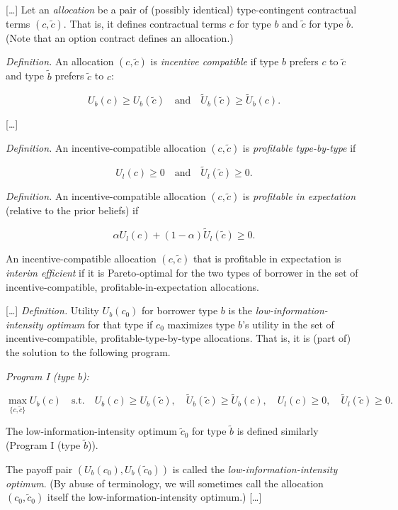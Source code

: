 \documentclass[11pt,a4paper]{article}
\begin{document}
{[}\ldots{]} Let an \emph{allocation} be a pair of (possibly identical) type-contingent contractual
terms \((c, \tilde{c})\). That is, it defines contractual terms \(c\) for type \(b\) and
\(\tilde{c}\) for type \(\tilde{b}\). (Note that an option contract defines an allocation.)

\emph{Definition.} An allocation \((c, \tilde{c})\) is \emph{incentive compatible} if type \(b\)
prefers \(c\) to \(\tilde{c}\) and type \(\tilde{b}\) prefers \(\tilde{c}\) to \(c\):

\[U_b(c) \geqslant U_b(\tilde{c}) \quad \text{and} \quad \tilde{U}_b(\tilde{c}) \geqslant \tilde{U}_b(c).\]

{[}\ldots{]}

\emph{Definition.} An incentive-compatible allocation \((c, \tilde{c})\) is \emph{profitable
type-by-type} if

\[U_l(c) \geqslant 0 \quad \text{and} \quad \tilde{U}_l(\tilde{c}) \geqslant 0.\]

\emph{Definition.} An incentive-compatible allocation \((c, \tilde{c})\) is \emph{profitable in
expectation} (relative to the prior beliefs) if

\[\alpha U_l(c) + (1 - \alpha)\tilde{U}_l(\tilde{c}) \geqslant 0.\]

An incentive-compatible allocation \((c, \tilde{c})\) that is profitable in expectation is
\emph{interim efficient} if it is Pareto-optimal for the two types of borrower in the set of
incentive-compatible, profitable-in-expectation allocations.

{[}\ldots{]} \emph{Definition.} Utility \(U_b(c_0)\) for borrower type \(b\) is the
\emph{low-information-intensity optimum} for that type if \(c_0\) maximizes type \(b\)'s utility in
the set of incentive-compatible, profitable-type-by-type allocations. That is, it is (part of) the
solution to the following program.

\emph{Program I (type \(b\)):}

\[\max_{\{c, \tilde{c}\}} U_b(c) \quad \text{s.t.} \quad U_b(c) \geqslant U_b(\tilde{c}), \quad \tilde{U}_b(\tilde{c}) \geqslant \tilde{U}_b(c), \quad U_l(c) \geqslant 0, \quad \tilde{U}_l(\tilde{c}) \geqslant 0.\]

The low-information-intensity optimum \(\tilde{c}_0\) for type \(\tilde{b}\) is defined similarly
(Program I (type \(\tilde{b}\))).

The payoff pair \((U_b(c_0), U_b(\tilde{c}_0))\) is called the \emph{low-information-intensity
optimum}. (By abuse of terminology, we will sometimes call the allocation \((c_0, \tilde{c}_0)\)
itself the low-information-intensity optimum.) {[}\ldots{]}
\end{document}
